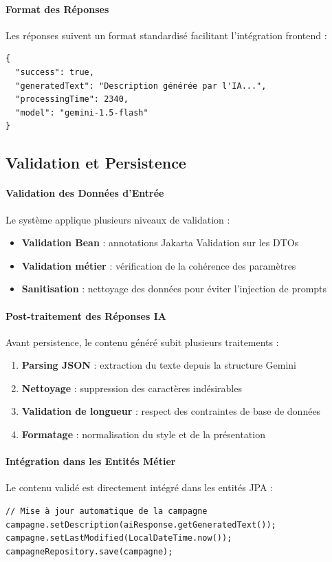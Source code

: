 \paragraph{Format des Réponses}
Les réponses suivent un format standardisé facilitant l'intégration frontend :
\begin{verbatim}
{
  "success": true,
  "generatedText": "Description générée par l'IA...",
  "processingTime": 2340,
  "model": "gemini-1.5-flash"
}
\end{verbatim}

\subsection{Validation et Persistence}

\paragraph{Validation des Données d'Entrée}
Le système applique plusieurs niveaux de validation :
\begin{itemize}[label=\textbullet]
    \item \textbf{Validation Bean} : annotations Jakarta Validation sur les DTOs
    \item \textbf{Validation métier} : vérification de la cohérence des paramètres
    \item \textbf{Sanitisation} : nettoyage des données pour éviter l'injection de prompts
\end{itemize}

\paragraph{Post-traitement des Réponses IA}
Avant persistence, le contenu généré subit plusieurs traitements :
\begin{enumerate}
    \item \textbf{Parsing JSON} : extraction du texte depuis la structure Gemini
    \item \textbf{Nettoyage} : suppression des caractères indésirables
    \item \textbf{Validation de longueur} : respect des contraintes de base de données
    \item \textbf{Formatage} : normalisation du style et de la présentation
\end{enumerate}

\paragraph{Intégration dans les Entités Métier}
Le contenu validé est directement intégré dans les entités JPA :
\begin{verbatim}
// Mise à jour automatique de la campagne
campagne.setDescription(aiResponse.getGeneratedText());
campagne.setLastModified(LocalDateTime.now());
campagneRepository.save(campagne);
\end{verbatim}

